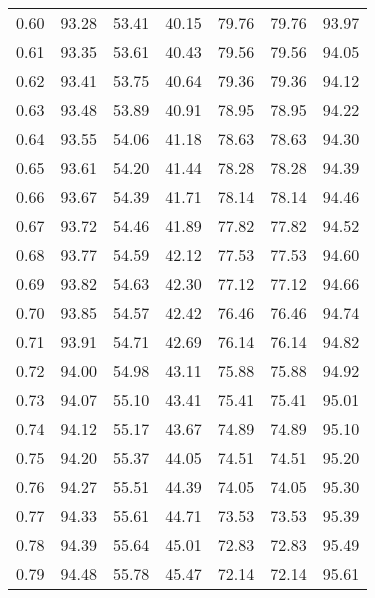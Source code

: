 \begin{tabular}{|c|c|c|c|c|c|c|}
      0.60 &     93.28 &     53.41 &      40.15 &   79.76 &      79.76 &         93.97 \\
      0.61 &     93.35 &     53.61 &      40.43 &   79.56 &      79.56 &         94.05 \\
      0.62 &     93.41 &     53.75 &      40.64 &   79.36 &      79.36 &         94.12 \\
      0.63 &     93.48 &     53.89 &      40.91 &   78.95 &      78.95 &         94.22 \\
      0.64 &     93.55 &     54.06 &      41.18 &   78.63 &      78.63 &         94.30 \\
      0.65 &     93.61 &     54.20 &      41.44 &   78.28 &      78.28 &         94.39 \\
      0.66 &     93.67 &     54.39 &      41.71 &   78.14 &      78.14 &         94.46 \\
      0.67 &     93.72 &     54.46 &      41.89 &   77.82 &      77.82 &         94.52 \\
      0.68 &     93.77 &     54.59 &      42.12 &   77.53 &      77.53 &         94.60 \\
      0.69 &     93.82 &     54.63 &      42.30 &   77.12 &      77.12 &         94.66 \\
      0.70 &     93.85 &     54.57 &      42.42 &   76.46 &      76.46 &         94.74 \\
      0.71 &     93.91 &     54.71 &      42.69 &   76.14 &      76.14 &         94.82 \\
      0.72 &     94.00 &     54.98 &      43.11 &   75.88 &      75.88 &         94.92 \\
      0.73 &     94.07 &     55.10 &      43.41 &   75.41 &      75.41 &         95.01 \\
      0.74 &     94.12 &     55.17 &      43.67 &   74.89 &      74.89 &         95.10 \\
      0.75 &     94.20 &     55.37 &      44.05 &   74.51 &      74.51 &         95.20 \\
      0.76 &     94.27 &     55.51 &      44.39 &   74.05 &      74.05 &         95.30 \\
      0.77 &     94.33 &     55.61 &      44.71 &   73.53 &      73.53 &         95.39 \\
      0.78 &     94.39 &     55.64 &      45.01 &   72.83 &      72.83 &         95.49 \\
      0.79 &     94.48 &     55.78 &      45.47 &   72.14 &      72.14 &         95.61 \\

\end{tabular}
